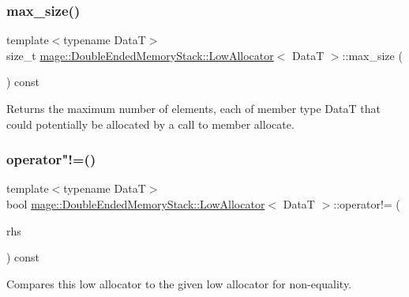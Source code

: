\subsubsection{\texorpdfstring{max\+\_\+size()}{max\_size()}}
{\footnotesize\ttfamily template$<$typename DataT$>$ \\
size\+\_\+t \hyperlink{structmage_1_1_double_ended_memory_stack_1_1_low_allocator}{mage\+::\+Double\+Ended\+Memory\+Stack\+::\+Low\+Allocator}$<$ DataT $>$\+::max\+\_\+size (\begin{DoxyParamCaption}{ }\end{DoxyParamCaption}) const\hspace{0.3cm}{\ttfamily [noexcept]}}

Returns the maximum number of elements, each of member type {\ttfamily DataT} that could potentially be allocated by a call to member allocate. \hypertarget{structmage_1_1_double_ended_memory_stack_1_1_low_allocator_a999a32dfba729a1a0d7d195021ace3d4}{}\label{structmage_1_1_double_ended_memory_stack_1_1_low_allocator_a999a32dfba729a1a0d7d195021ace3d4} 
\subsubsection{\texorpdfstring{operator"!=()}{operator!=()}}
{\footnotesize\ttfamily template$<$typename DataT$>$ \\
bool \hyperlink{structmage_1_1_double_ended_memory_stack_1_1_low_allocator}{mage\+::\+Double\+Ended\+Memory\+Stack\+::\+Low\+Allocator}$<$ DataT $>$\+::operator!= (\begin{DoxyParamCaption}\item[{const \hyperlink{structmage_1_1_double_ended_memory_stack_1_1_low_allocator}{Low\+Allocator}$<$ DataT $>$ \&}]{rhs }\end{DoxyParamCaption}) const\hspace{0.3cm}{\ttfamily [noexcept]}}

Compares this low allocator to the given low allocator for non-\/equality.


